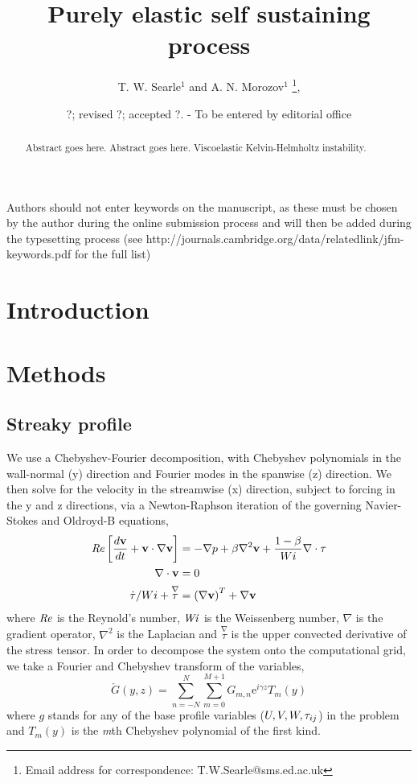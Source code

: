 \documentclass{jfm}
\title[Purely elastic self sustaining process]{Purely elastic self sustaining process}
\author[T. W. Searle and A. N. Morozov]%
{T. W. Searle$^1$ and A. N. Morozov$^1$%
  \thanks{Email address for correspondence: T.W.Searle@sms.ed.ac.uk},\ns
}
\affiliation{$^1$SUPA, School of Physics and Astronomy, University of Edinburgh, Mayfield Road,
Edinburgh, EH9 3JZ, UK\\[\affilskip]
}
\date{?; revised ?; accepted ?. - To be entered by editorial office}
\newcommand\Wi{\mbox{\textit{Wi}}}
\newcommand{\dt}[1]{\frac{d #1}{d t}} %
\newcommand{\me}{\mathrm{e}}
\newcommand\Rey{\mbox{\textit{Re}}}  %
\begin{document}
\maketitle

\begin{abstract}
  Abstract goes here. Abstract goes here. Viscoelastic Kelvin-Helmholtz instability. 
\end{abstract}

\begin{keywords}
Authors should not enter keywords on the manuscript, as these must be chosen by the author during the online submission process and will then be added during the typesetting process (see http://journals.cambridge.org/data/\linebreak[3]relatedlink/jfm-\linebreak[3]keywords.pdf for the full list)
\end{keywords}

\section{Introduction}

\section{Methods}

\subsection{Streaky profile}

We use a Chebyshev-Fourier decomposition, with Chebyshev polynomials in the wall-normal (y) direction and Fourier modes in the spanwise (z) direction. We then solve for the velocity in the streamwise (x) direction, subject to forcing in the y and z directions, via a Newton-Raphson iteration of the governing Navier-Stokes and Oldroyd-B equations,
\begin{align}
    \Rey \left[ \dt{\mathbf{v}} + \mathbf{v} \cdot \nabla  \mathbf{v} \right] &= - \nabla p + \beta \nabla^{2} \mathbf{v} + \frac{1-\beta}{Wi} \nabla \cdot \mathbf{\tau} \label{eq:Navier-Stokes}\\
    \nabla \cdot \mathbf{v} &= 0 \label{eq:incompressibility}\\
    \dot{\tau}/Wi + \overset{\nabla}\tau &= \left(\nabla \mathbf{v}\right)^{T} + \nabla{\mathbf{v}}\label{eq:Oldroyd-B}
\end{align}
where $\Rey$ is the Reynold's number, $\Wi$ is the Weissenberg number, $\nabla$ is the gradient operator, $\nabla^{2}$ is the Laplacian and $ \overset{\nabla}\tau$ is the upper convected derivative of the stress tensor. In order to decompose the system onto the computational grid, we take a Fourier and Chebyshev transform of the variables,
\begin{equation}
    \check{G}(y,z) = \sum_{n=-N}^{N} \sum_{m=0}^{M+1} G_{m,n} \me^{i\gamma z} T_{m}(y) \label{eq:decomp}
\end{equation}
where $g$ stands for any of the base profile variables ($U,V,W,\boldmath{\tau}_{ij}$) in the problem and $T_{m}(y)$ is the \textit{m}th Chebyshev polynomial of the first kind.
\end{document}
